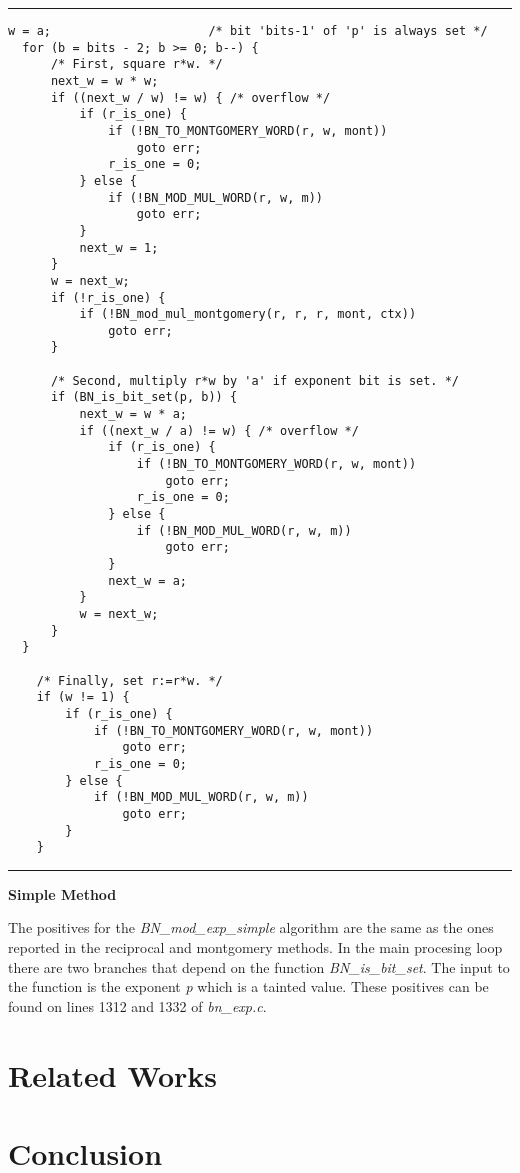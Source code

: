 \documentclass[11pt,a4paper]{article}
\newcommand{\codevar}[1]{\textit{#1}}
\newcommand{\codefn}[1]{\textit{#1}}
\newcommand{\codefile}[1]{\textit{#1}}
\newcommand{\ruleabove}{\vspace{5pt}\hrule}
\newcommand{\rulebelow}{\hrule\vspace{5pt}}
\begin{document}
\ruleabove
\begin{lstlisting}[caption=OpenSSL 1.1.0g - bn\_exp.c lines 1178-1227]
  w = a;                      /* bit 'bits-1' of 'p' is always set */
  for (b = bits - 2; b >= 0; b--) {
      /* First, square r*w. */
      next_w = w * w;
      if ((next_w / w) != w) { /* overflow */
          if (r_is_one) {
              if (!BN_TO_MONTGOMERY_WORD(r, w, mont))
                  goto err;
              r_is_one = 0;
          } else {
              if (!BN_MOD_MUL_WORD(r, w, m))
                  goto err;
          }
          next_w = 1;
      }
      w = next_w;
      if (!r_is_one) {
          if (!BN_mod_mul_montgomery(r, r, r, mont, ctx))
              goto err;
      }

      /* Second, multiply r*w by 'a' if exponent bit is set. */
      if (BN_is_bit_set(p, b)) {
          next_w = w * a;
          if ((next_w / a) != w) { /* overflow */
              if (r_is_one) {
                  if (!BN_TO_MONTGOMERY_WORD(r, w, mont))
                      goto err;
                  r_is_one = 0;
              } else {
                  if (!BN_MOD_MUL_WORD(r, w, m))
                      goto err;
              }
              next_w = a;
          }
          w = next_w;
      }
  }

    /* Finally, set r:=r*w. */
    if (w != 1) {
        if (r_is_one) {
            if (!BN_TO_MONTGOMERY_WORD(r, w, mont))
                goto err;
            r_is_one = 0;
        } else {
            if (!BN_MOD_MUL_WORD(r, w, m))
                goto err;
        }
    }
\end{lstlisting}
\rulebelow

\noindent
\textbf{Simple Method}

   The positives for the \codefn{BN\_mod\_exp\_simple} algorithm are the same as the ones
   reported in the reciprocal and montgomery methods. In the main procesing loop
   there are two branches that depend on the function \codefn{BN\_is\_bit\_set}. The input
   to the function is the exponent \codevar{p} which is a tainted value. These positives
   can be found on lines 1312 and 1332 of \codefile{bn\_exp.c}.
\section{Related Works}

\section{Conclusion}

{}

\end{document}
